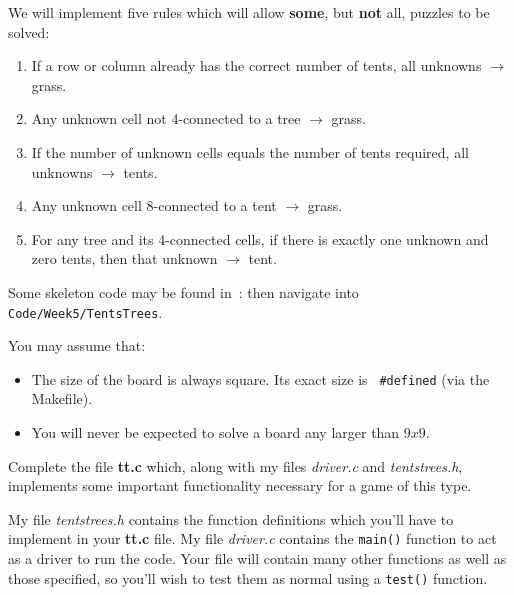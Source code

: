 \begin{exercise}

We will implement five rules which will allow {\bf some}, but {\bf not}
all, puzzles to be solved:

\begin{enumerate}

\item If a row or column already has the correct number of tents, all
unknowns $\rightarrow$ grass.

\item Any unknown cell not 4-connected to a tree $\rightarrow$ grass.

\item If the number of unknown cells equals the number of tents required,
all unknowns $\rightarrow$ tents.

\item Any unknown cell 8-connected to a tent $\rightarrow$ grass.

\item For any tree and its 4-connected cells, if there is exactly one
unknown and zero tents, then that unknown $\rightarrow$ tent.

\end{enumerate}

\noindent Some skeleton code may be found in~:
 \noindent then navigate
into \verb^Code/Week5/TentsTrees^.

You may assume that:
\begin{itemize}

\item The size of the board is always square. Its exact size is {\tt
\#defined} (via the Makefile).

\item You will never be expected to solve a board any larger than $9x9$.
\end{itemize}

Complete the file {\bf tt.c} which, along with
my files {\em driver.c} and {\em tentstrees.h}, implements some important
functionality necessary for a game of this type.

\noindent My file {\em tentstrees.h} contains the function definitions
which you'll have to implement in your {\bf tt.c} file. My file
{\em driver.c} contains the \verb^main()^ function to act as a driver to
run the code. Your file will contain many other functions as well as those
specified, so you'll wish to test them as normal using a \verb^test()^
function.


\end{exercise}
